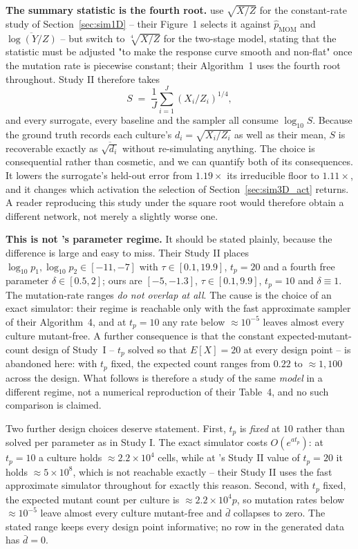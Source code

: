 \documentclass[sn-basic,iicol,pdflatex]{sn-jnl}
\newcommand{\dbar}{\ensuremath{\bar d}}
\begin{document}
\noindent\textbf{The summary statistic is the fourth root.} \citeauthor{lu2023} use
$\sqrt{X/Z}$ for the constant-rate study of Section~\ref{sec:sim1D} -- their
Figure~1 selects it against $\hat p_{\mathrm{MOM}}$ and
$\overline{\log(Y/Z)}$ -- but switch to $\sqrt[4]{X/Z}$ for the two-stage
model, stating that the statistic must be adjusted "to make the response curve
smooth and non-flat" once the mutation rate is piecewise constant; their
Algorithm~1 uses the fourth root throughout. Study II therefore takes
\[
  S \;=\; \frac{1}{J}\sum_{i=1}^{J} \left(X_i/Z_i\right)^{1/4},
\]
and every surrogate, every baseline and the sampler all consume $\log_{10}S$.
Because the ground truth records each culture's $d_i = \sqrt{X_i/Z_i}$ as well
as their mean, $S$ is recoverable exactly as $\overline{\sqrt{d_i}}$ without
re-simulating anything. The choice is consequential rather than cosmetic, and we can quantify both of
its consequences. It lowers the surrogate's held-out error from $1.19\times$ its
irreducible floor to $1.11\times$, and it changes which activation the selection
of Section~\ref{sec:sim3D_act} returns. A reader reproducing this study under
the square root would therefore obtain a different network, not merely a
slightly worse one.

\noindent\textbf{This is not \citeauthor{lu2023}'s parameter regime.} It should be
stated plainly, because the difference is large and easy to miss. Their Study II
places $\log_{10}p_1, \log_{10}p_2 \in [-11,-7]$ with $\tau \in [0.1,19.9]$,
$t_p = 20$ and a fourth free parameter $\delta \in [0.5,2]$; ours are
$[-5,-1.3]$, $\tau \in [0.1,9.9]$, $t_p = 10$ and $\delta \equiv 1$. The
mutation-rate ranges \emph{do not overlap at all}. The cause is the choice of an
exact simulator: their regime is reachable only with the fast approximate
sampler of their Algorithm~4, and at $t_p = 10$ any rate below $\approx 10^{-5}$
leaves almost every culture mutant-free. A further consequence is that the
constant expected-mutant-count design of Study~I -- $t_p$ solved so that
$E[X] = 20$ at every design point -- is abandoned here: with $t_p$ fixed, the
expected count ranges from $0.22$ to $\approx 1{,}100$ across the design. What
follows is therefore a study of the same \emph{model} in a different regime, not
a numerical reproduction of their Table~4, and no such comparison is claimed.

Two further design choices deserve statement. First, $t_p$ is \emph{fixed} at $10$
rather than solved per parameter as in Study I. The exact simulator costs
$O(e^{a t_p})$: at $t_p = 10$ a culture holds $\approx 2.2\times10^{4}$ cells,
while at \citeauthor{lu2023}'s Study II value of $t_p = 20$ it holds
$\approx 5\times10^{8}$, which is not reachable exactly -- their Study II uses
the fast approximate simulator throughout for exactly this reason. Second, with
$t_p$ fixed, the expected mutant count per culture is $\approx 2.2\times10^{4}p$,
so mutation rates below $\approx 10^{-5}$ leave almost every culture
mutant-free and $\dbar$ collapses to zero. The stated range keeps every design
point informative; no row in the generated data has $\dbar = 0$.
\end{document}

